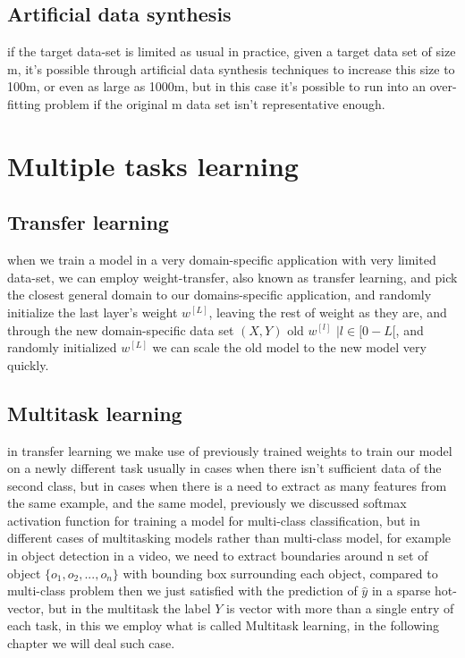\documentclass[4apaper,12pt]{book}
\begin{document}
\begin{description}
\begin{description}
    \subsection{Artificial data synthesis}
  \item if the target data-set is limited as usual in practice, given a target data set of size m, it's possible through artificial data synthesis techniques to increase this size to 100m, or even as large as 1000m, but in this case it's possible to run into an over-fitting problem if the original m data set isn't representative enough.
  \end{description}

  \section{Multiple tasks learning}
  \begin{description}
    \subsection{Transfer learning}
    \item when we train a model in a very domain-specific application with very limited data-set, we can employ weight-transfer, also known as transfer learning, and pick the closest general domain to our domains-specific application, and randomly initialize the last layer's weight $w^{[L]}$, leaving the rest of weight as they are, and through the new domain-specific data set $(X,Y)$ old $w^{[l]}$ $ | l \in [0-L[$, and randomly initialized $w^{[L]}$ we can scale the old model to the new model very quickly.
    \end{description}
    \subsection{Multitask learning}
    \item in transfer learning we make use of previously trained weights to train our model on a newly different task usually in cases when there isn't sufficient data of the second class, but in cases when there is a need to extract as many features from the same example, and the same model, previously we discussed softmax activation function for training a model for multi-class classification, but in different cases of multitasking models rather than multi-class model, for example in object detection in a video, we need to extract boundaries around n set of object $\{o_1,o_2,...,o_n\}$ with bounding box surrounding each object, compared to multi-class problem then we just satisfied with the prediction of $\hat{y}$ in a sparse hot-vector, but in the multitask the label $Y$ is vector with more than a single entry of each task, in this we employ what is called Multitask learning, in the following chapter we will deal such case.
  \end{description}
\end{document}
